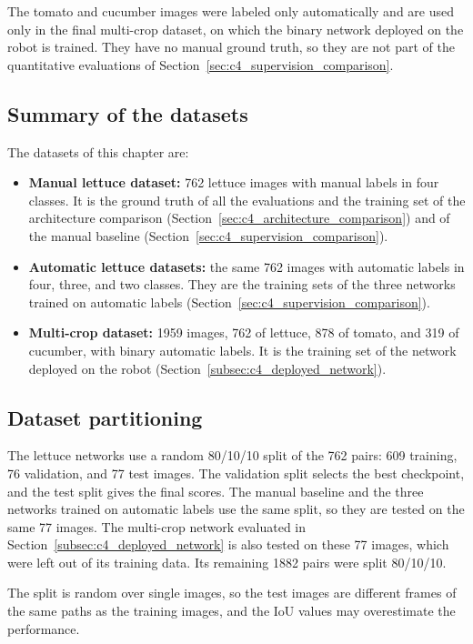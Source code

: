 The tomato and cucumber images were labeled only automatically and are used only in the final multi-crop dataset, on which the binary network deployed on the robot is trained. They have no manual ground truth, so they are not part of the quantitative evaluations of Section~\ref{sec:c4_supervision_comparison}.

\subsection{Summary of the datasets}
\label{subsec:c4_dataset_summary}

The datasets of this chapter are:
\begin{itemize}
\item \textbf{Manual lettuce dataset:} 762 lettuce images with manual labels in four classes. It is the ground truth of all the evaluations and the training set of the architecture comparison (Section~\ref{sec:c4_architecture_comparison}) and of the manual baseline (Section~\ref{sec:c4_supervision_comparison}).
\item \textbf{Automatic lettuce datasets:} the same 762 images with automatic labels in four, three, and two classes. They are the training sets of the three networks trained on automatic labels (Section~\ref{sec:c4_supervision_comparison}).
\item \textbf{Multi-crop dataset:} 1959 images, 762 of lettuce, 878 of tomato, and 319 of cucumber, with binary automatic labels. It is the training set of the network deployed on the robot (Section~\ref{subsec:c4_deployed_network}).
\end{itemize}

\subsection{Dataset partitioning}
\label{subsec:c4_dataset_splits}

The lettuce networks use a random 80/10/10 split of the 762 pairs: 609 training, 76 validation, and 77 test images. The validation split selects the best checkpoint, and the test split gives the final scores. The manual baseline and the three networks trained on automatic labels use the same split, so they are tested on the same 77 images. The multi-crop network evaluated in Section~\ref{subsec:c4_deployed_network} is also tested on these 77 images, which were left out of its training data. Its remaining 1882 pairs were split 80/10/10.

The split is random over single images, so the test images are different frames of the same paths as the training images, and the IoU values may overestimate the performance.

